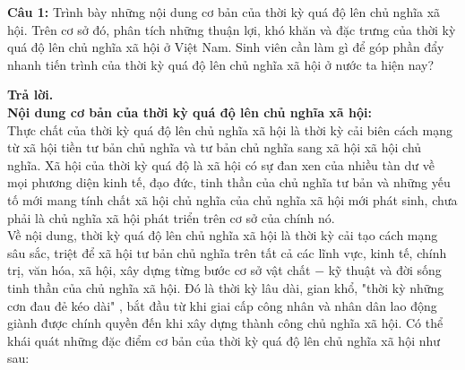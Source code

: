 \begin{mybox}
\textbf{Câu 1:} Trình bày những nội dung cơ bản của thời kỳ quá độ lên chủ nghĩa xã hội. Trên cơ sở đó, phân tích những thuận lợi, khó khăn và đặc trưng của thời kỳ quá độ lên chủ nghĩa xã hội ở Việt Nam. Sinh viên cần làm gì để góp phần đẩy nhanh tiến trình của thời kỳ quá độ lên chủ nghĩa xã hội ở nước ta hiện nay?
\end{mybox}
\textbf{Trả lời.}\\
\textbf{Nội dung cơ bản của thời kỳ quá độ lên chủ nghĩa xã hội:}\\
Thực chất của thời kỳ quá độ lên chủ nghĩa xã hội là thời kỳ cải biên cách mạng từ xã hội tiền tư bản chủ nghĩa và tư bản chủ nghĩa sang xã hội xã hội chủ nghĩa. Xã hội của thời kỳ quá độ là xã hội có sự đan xen của nhiều tàn dư về mọi phương diện kinh tế, đạo đức, tinh thần của chủ nghĩa tư bản và những yếu tố mới mang tính chất xã hội chủ nghĩa của chủ nghĩa xã hội mới phát sinh, chưa phải là chủ nghĩa xã hội phát triển trên cơ sở của chính nó.\\
Về nội dung, thời kỳ quá độ lên chủ nghĩa xã hội là thời kỳ cải tạo cách mạng sâu sắc, triệt để xã hội tư bản chủ nghĩa trên tất cả các lĩnh vực, kinh tế, chính trị, văn hóa, xã hội, xây dựng từng bước cơ sở vật chất $-$ kỹ thuật và đời sống tinh thần của chủ nghĩa xã hội. Đó là thời kỳ lâu dài, gian khổ, "thời kỳ những cơn đau đẻ kéo dài" \supercite{Lenintt33}, bắt đầu từ khi giai cấp công nhân và nhân dân lao động giành được chính quyền đến khi xây dựng thành công chủ nghĩa xã hội. Có thể khái quát những đặc điểm cơ bản của thời kỳ quá độ lên chủ nghĩa xã hội như sau:
